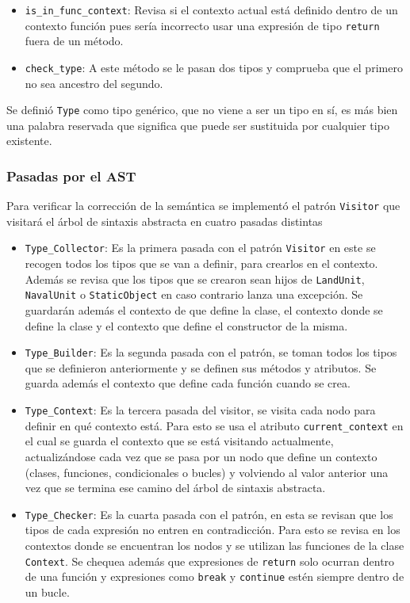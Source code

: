 \begin{itemize}
\begin{itemize}
	\item \verb|is_in_func_context|: Revisa si el contexto actual está definido dentro de un contexto función pues sería incorrecto usar una expresión de tipo \verb|return| fuera de un método. 
	
	\item \verb|check_type|: A este método se le pasan dos tipos y comprueba que el primero no sea ancestro del segundo.

	
\end{itemize}

\end{itemize}

Se definió \verb|Type| como tipo genérico, que no viene a ser un tipo en sí, es más bien una palabra reservada que significa que puede ser sustituida por cualquier tipo existente.

\subsubsection{Pasadas por el AST}
Para verificar la correcci\'on de la sem\'antica se implement\'o el patr\'on \verb|Visitor| que visitar\'a el \'arbol de sintaxis abstracta en cuatro pasadas distintas
\begin{itemize}
\item \verb|Type_Collector|: Es la primera pasada con el patr\'on \verb|Visitor| en este se recogen todos los tipos que se van a definir, para crearlos en el contexto. Además se revisa que los tipos que se crearon sean hijos de  \verb|LandUnit|, \verb|NavalUnit| o \verb|StaticObject| en caso contrario lanza una excepción. Se guardarán además el contexto de que define la clase, el contexto donde se define la clase y el contexto que define el constructor de la misma.

\item \verb|Type_Builder|: Es la segunda pasada con el patr\'on, se toman todos los tipos que se definieron anteriormente y se definen sus m\'etodos y atributos. Se guarda además el contexto que define cada función cuando se crea.

\item \verb|Type_Context|: Es la tercera pasada del visitor, se visita cada nodo para definir en qu\'e contexto est\'a. Para esto se usa el atributo \verb|current_context| en el cual se guarda el contexto que se está visitando actualmente, actualizándose cada vez que se pasa por un nodo que define un contexto (clases, funciones, condicionales o bucles) y volviendo al valor anterior una vez que se termina ese camino del \'arbol de sintaxis abstracta. 

\item \verb|Type_Checker|: Es la cuarta pasada con el patr\'on, en esta se revisan que los tipos de cada expresi\'on no entren en contradicci\'on. Para esto se revisa en los contextos donde se encuentran los nodos y se utilizan las funciones de la clase \verb|Context|. Se chequea adem\'as que expresiones de \verb|return| solo ocurran dentro de una función y expresiones como \verb|break| y \verb|continue| estén siempre dentro de un bucle.


\end{itemize}


